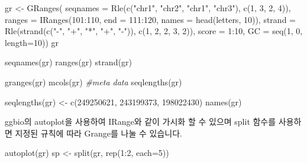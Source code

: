 \documentclass[
]{book}
\newenvironment{Shaded}{\begin{snugshade}}{\end{snugshade}}
\newcommand{\AttributeTok}[1]{\textcolor[rgb]{0.77,0.63,0.00}{#1}}
\newcommand{\CommentTok}[1]{\textcolor[rgb]{0.56,0.35,0.01}{\textit{#1}}}
\newcommand{\DecValTok}[1]{\textcolor[rgb]{0.00,0.00,0.81}{#1}}
\newcommand{\FunctionTok}[1]{\textcolor[rgb]{0.00,0.00,0.00}{#1}}
\newcommand{\NormalTok}[1]{#1}
\newcommand{\OtherTok}[1]{\textcolor[rgb]{0.56,0.35,0.01}{#1}}
\newcommand{\SpecialCharTok}[1]{\textcolor[rgb]{0.00,0.00,0.00}{#1}}
\newcommand{\StringTok}[1]{\textcolor[rgb]{0.31,0.60,0.02}{#1}}
\begin{document}
\begin{Shaded}
\begin{Highlighting}[]
\NormalTok{gr }\OtherTok{\textless{}{-}} \FunctionTok{GRanges}\NormalTok{(}
    \AttributeTok{seqnames =} \FunctionTok{Rle}\NormalTok{(}\FunctionTok{c}\NormalTok{(}\StringTok{"chr1"}\NormalTok{, }\StringTok{"chr2"}\NormalTok{, }\StringTok{"chr1"}\NormalTok{, }\StringTok{"chr3"}\NormalTok{), }\FunctionTok{c}\NormalTok{(}\DecValTok{1}\NormalTok{, }\DecValTok{3}\NormalTok{, }\DecValTok{2}\NormalTok{, }\DecValTok{4}\NormalTok{)),}
    \AttributeTok{ranges =} \FunctionTok{IRanges}\NormalTok{(}\DecValTok{101}\SpecialCharTok{:}\DecValTok{110}\NormalTok{, }\AttributeTok{end =} \DecValTok{111}\SpecialCharTok{:}\DecValTok{120}\NormalTok{, }\AttributeTok{names =} \FunctionTok{head}\NormalTok{(letters, }\DecValTok{10}\NormalTok{)),}
    \AttributeTok{strand =} \FunctionTok{Rle}\NormalTok{(}\FunctionTok{strand}\NormalTok{(}\FunctionTok{c}\NormalTok{(}\StringTok{"{-}"}\NormalTok{, }\StringTok{"+"}\NormalTok{, }\StringTok{"*"}\NormalTok{, }\StringTok{"+"}\NormalTok{, }\StringTok{"{-}"}\NormalTok{)), }\FunctionTok{c}\NormalTok{(}\DecValTok{1}\NormalTok{, }\DecValTok{2}\NormalTok{, }\DecValTok{2}\NormalTok{, }\DecValTok{3}\NormalTok{, }\DecValTok{2}\NormalTok{)),}
    \AttributeTok{score =} \DecValTok{1}\SpecialCharTok{:}\DecValTok{10}\NormalTok{,}
    \AttributeTok{GC =} \FunctionTok{seq}\NormalTok{(}\DecValTok{1}\NormalTok{, }\DecValTok{0}\NormalTok{, }\AttributeTok{length=}\DecValTok{10}\NormalTok{))}
\NormalTok{gr}

\FunctionTok{seqnames}\NormalTok{(gr)}
\FunctionTok{ranges}\NormalTok{(gr)}
\FunctionTok{strand}\NormalTok{(gr)}

\FunctionTok{granges}\NormalTok{(gr) }
\FunctionTok{mcols}\NormalTok{(gr) }\CommentTok{\#meta data}
\FunctionTok{seqlengths}\NormalTok{(gr)}

\FunctionTok{seqlengths}\NormalTok{(gr) }\OtherTok{\textless{}{-}} \FunctionTok{c}\NormalTok{(}\DecValTok{249250621}\NormalTok{, }\DecValTok{243199373}\NormalTok{, }\DecValTok{198022430}\NormalTok{)}
\FunctionTok{names}\NormalTok{(gr)}
\end{Highlighting}
\end{Shaded}

ggbio의 autoplot을 사용하여 IRange와 같이 가시화 할 수 있으며 split 함수를 사용하면 지정된 규칙에 따라 Grange를 나눌 수 있습니다.

\begin{Shaded}
\begin{Highlighting}[]
\FunctionTok{autoplot}\NormalTok{(gr)}
\NormalTok{sp }\OtherTok{\textless{}{-}} \FunctionTok{split}\NormalTok{(gr, }\FunctionTok{rep}\NormalTok{(}\DecValTok{1}\SpecialCharTok{:}\DecValTok{2}\NormalTok{, }\AttributeTok{each=}\DecValTok{5}\NormalTok{))}
\end{Highlighting}
\end{Shaded}
\end{document}
